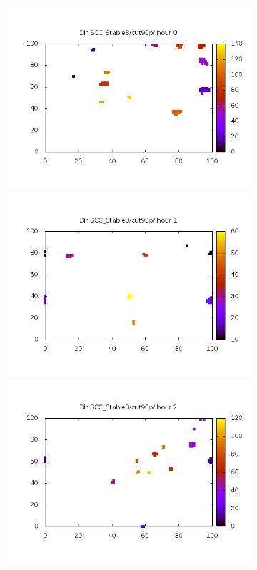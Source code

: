 \documentclass[10pt,a4paper]{article}
\begin{document}
\begin{figure}
\centering
\begin{subfigure}[b]{1\textwidth}
\includegraphics[scale=.20]{./img/SCC_Stable3/cut90p/0.png}
\includegraphics[scale=.20]{./img/SCC_Stable3/cut90p/1.png}
\includegraphics[scale=.20]{./img/SCC_Stable3/cut90p/2.png}
\end{subfigure}


\end{figure}
\end{document}
